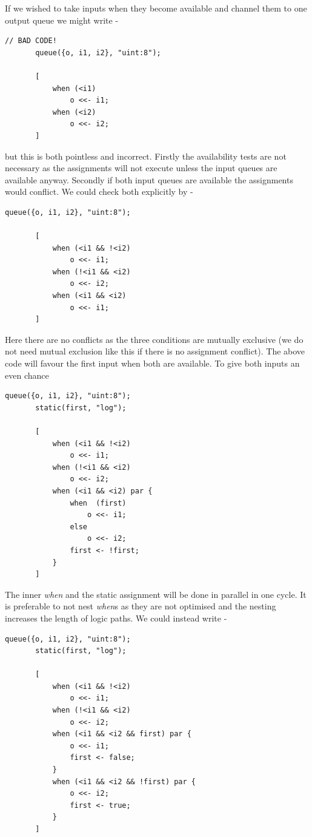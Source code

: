     If we wished to take inputs when they become available
    and channel them to one output queue we might write -
    \begin{lstlisting}[gobble=4, language=threepl]
       // BAD CODE!
       queue({o, i1, i2}, "uint:8");

       [
           when (<i1)
               o <<- i1;
           when (<i2)
               o <<- i2;
       ]
    \end{lstlisting}
    but this is both pointless and incorrect. Firstly the
    availability tests are not necessary as the assignments will
    not execute unless the input queues are available anyway.
    Secondly if both input queues are available
    the assignments would conflict. We could check both
    explicitly by -
    \begin{lstlisting}[gobble=4, language=threepl]
       queue({o, i1, i2}, "uint:8");

       [
           when (<i1 && !<i2)
               o <<- i1;
           when (!<i1 && <i2)
               o <<- i2;
           when (<i1 && <i2)
               o <<- i1;
       ]
    \end{lstlisting}
    Here there are no conflicts as the three conditions are
    mutually exclusive (we do not need mutual exclusion
    like this if there is no assignment conflict).
    The above code will favour the first input when both are
    available. To give both inputs an even chance
    \begin{lstlisting}[gobble=4, language=threepl]
       queue({o, i1, i2}, "uint:8");
       static(first, "log");

       [
           when (<i1 && !<i2)
               o <<- i1;
           when (!<i1 && <i2)
               o <<- i2;
           when (<i1 && <i2) par {
               when  (first)
                   o <<- i1;
               else
                   o <<- i2;
               first <- !first;
           }
       ]
    \end{lstlisting}
    The inner {\em when} and the static assignment will be done in
    parallel in one cycle. It is preferable to not nest {\em when}s
    as they are not optimised and the nesting increases the length of logic
    paths. We could instead write -
    \begin{lstlisting}[gobble=4, language=threepl]
       queue({o, i1, i2}, "uint:8");
       static(first, "log");

       [
           when (<i1 && !<i2)
               o <<- i1;
           when (!<i1 && <i2)
               o <<- i2;
           when (<i1 && <i2 && first) par {
               o <<- i1;
               first <- false;
           }
           when (<i1 && <i2 && !first) par {
               o <<- i2;
               first <- true;
           }
       ]
    \end{lstlisting}

